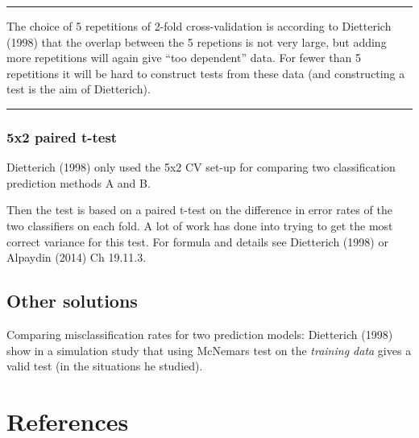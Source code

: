 \documentclass[
  letterpaper,
  DIV=11,
  numbers=noendperiod]{scrartcl}
\begin{document}
\begin{center}\rule{0.5\linewidth}{0.5pt}\end{center}

The choice of 5 repetitions of 2-fold cross-validation is according to
Dietterich (1998) that the overlap between the 5 repetions is not very
large, but adding more repetitions will again give ``too dependent''
data. For fewer than 5 repetitions it will be hard to construct tests
from these data (and constructing a test is the aim of Dietterich).

\begin{center}\rule{0.5\linewidth}{0.5pt}\end{center}

\hypertarget{x2-paired-t-test}{%
\subsubsection{5x2 paired t-test}\label{x2-paired-t-test}}

Dietterich (1998) only used the 5x2 CV set-up for comparing two
classification prediction methods A and B.

Then the test is based on a paired t-test on the difference in error
rates of the two classifiers on each fold. A lot of work has done into
trying to get the most correct variance for this test. For formula and
details see Dietterich (1998) or Alpaydin (2014) Ch 19.11.3.

\hypertarget{other-solutions}{%
\subsection{Other solutions}\label{other-solutions}}

Comparing misclassification rates for two prediction models: Dietterich
(1998) show in a simulation study that using McNemars test on the
\emph{training data} gives a valid test (in the situations he studied).

\hypertarget{references}{%
\section{References}\label{references}}
\end{document}
